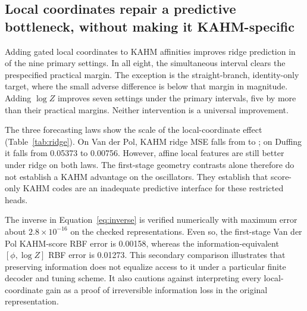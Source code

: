 \documentclass[10pt]{article}
\begin{document}
\subsection{Local coordinates repair a predictive bottleneck, without making it KAHM-specific}
\label{sec:localresults}

Adding gated local coordinates to KAHM affinities improves ridge prediction
in \LocalPracticalBenefitCount{} of the nine primary settings. In all eight, the simultaneous
interval clears the prespecified practical margin. The exception is the
straight-branch, identity-only target, where the small adverse difference
is below that margin in magnitude. Adding $\log Z$ improves seven settings
under the primary intervals, five by more than their practical margins.
Neither intervention is a universal improvement.

The three forecasting laws show the scale of the local-coordinate effect
(Table~\ref{tab:ridge}). On Van der Pol, KAHM ridge MSE falls from \VDPPhiRidgeMSE{}
to \VDPKAHMLocalRidgeMSE{}; on Duffing it falls from 0.05373 to 0.00756. However, affine
local features are still better under ridge on both laws. The first-stage
geometry contrasts alone therefore do not establish a KAHM advantage on
the oscillators. They establish that score-only KAHM codes are an
inadequate predictive interface for these restricted heads.

\begin{table}[t]
 \caption{All nine first-stage primary settings: mean test MSE over
 24 repetitions for ridge decoders. The local-coordinate improvement $L$
 and its interval belong to the 29-comparison family. Retaining local
 position substantially improves KAHM prediction in eight settings;
 KAHM local coordinates do not dominate affine local coordinates.}
 \label{tab:ridge}
 \centering\small\setlength{\tabcolsep}{3pt}
 
\end{table}

The inverse in Equation~\eqref{eq:inverse} is verified numerically with
maximum error about $2.8\times10^{-16}$ on the checked representations.
Even so, the first-stage Van der Pol KAHM-score RBF error is 0.00158,
whereas the information-equivalent $[\phi,\log Z]$ RBF error is 0.01273.
This secondary comparison illustrates that preserving information does
not equalize access to it under a particular finite decoder and tuning
scheme. It also cautions against interpreting every local-coordinate gain
as a proof of irreversible information loss in the original representation.
\end{document}
